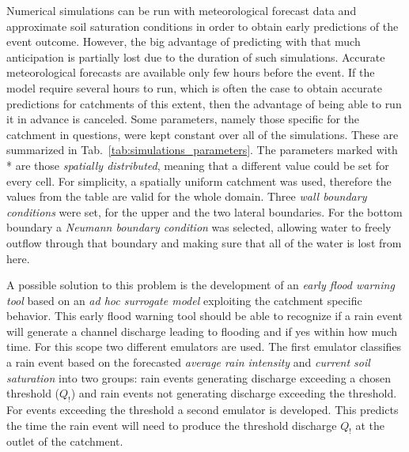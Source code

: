 Numerical simulations can be run with meteorological forecast data and approximate soil saturation conditions in order to obtain early predictions of the event outcome.
However, the big advantage of predicting with that much anticipation is partially lost due to the duration of such simulations.
Accurate meteorological forecasts are available only few hours before the event.
If the model require several hours to run, which is often the case to obtain accurate predictions for catchments of this extent, then the advantage of being able to run it in advance is canceled.
Some parameters, namely those specific for the catchment in questions, were kept constant over all of the simulations.
These are summarized in Tab.~\ref{tab:simulations_parameters}.
The parameters marked with * are those \emph{spatially distributed}, meaning that a different value could be set for every cell.
For simplicity, a spatially uniform catchment was used, therefore the values from the table are valid for the whole domain.
Three \textit{wall boundary conditions} were set, for the upper and the two lateral boundaries.
For the bottom boundary a \textit{Neumann boundary condition} was selected, allowing water to freely outflow through that boundary and making sure that all of the water is lost from here.

A possible solution to this problem is the development of an \emph{early flood warning tool} based on an \emph{ad hoc surrogate model} exploiting the catchment specific behavior.
This early flood warning tool should be able to recognize if a rain event will generate a channel discharge leading to flooding and if yes within how much time.
For this scope two different emulators are used.
The first emulator classifies a rain event based on the forecasted \emph{average rain intensity} and \emph{current soil saturation} into two groups: rain events generating discharge exceeding a chosen threshold ($Q_!$) and rain events not generating discharge exceeding the threshold.
For events exceeding the threshold a second emulator is developed.
This predicts the time the rain event will need to produce the threshold discharge $Q_!$ at the outlet of the catchment.



